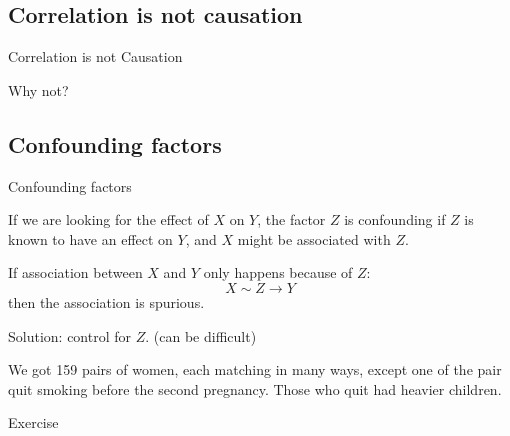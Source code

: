 \subsection{Correlation is not causation}

%
\begin{frame}{Correlation is not Causation}

  \begin{center}

  \end{center}

  \vspace{2em}

  \alert{Why not?}

\end{frame}

\subsection{Confounding factors}

%
\begin{frame}{Confounding factors}

If we are looking for the effect of $X$ on $Y$,
the factor $Z$ is \alert{confounding} if $Z$ is known to have an effect on $Y$,
and $X$ might be associated with $Z$.

\vspace{2em}

If association between $X$ and $Y$ only happens because of $Z$:
\[
  X \sim Z \longrightarrow Y
\]
then the association is \alert{spurious}.

\vspace{2em}

\alert{Solution:} control for $Z$.  (can be difficult)

\vspace{2em}

 We got 159 pairs of women,
    each matching in many ways, except one of the pair quit smoking before the second pregnancy.
    Those who quit had heavier children.

\end{frame}

\begin{frame}{Exercise}

  \begin{center}
  \end{center}


\end{frame}


